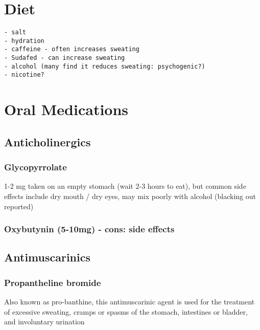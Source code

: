 \documentclass[]{book}
\begin{document}
\hypertarget{diet}{%
\chapter{Diet}\label{diet}}

\begin{verbatim}
- salt
- hydration
- caffeine - often increases sweating
- Sudafed - can increase sweating
- alcohol (many find it reduces sweating: psychogenic?)
- nicotine?
\end{verbatim}

\hypertarget{oral}{%
\chapter{Oral Medications}\label{oral}}

\hypertarget{anticholinergics}{%
\section{Anticholinergics}\label{anticholinergics}}

\hypertarget{glycopyrrolate}{%
\subsection{Glycopyrrolate}\label{glycopyrrolate}}

1-2 mg taken on an empty stomach (wait 2-3 hours to eat), but common side effects include dry mouth / dry eyes, may mix poorly with alcohol (blacking out reported)

\hypertarget{oxybutynin-5-10mg---cons-side-effects}{%
\subsection{Oxybutynin (5-10mg) - cons: side effects}\label{oxybutynin-5-10mg---cons-side-effects}}

\hypertarget{antimuscarinics}{%
\section{Antimuscarinics}\label{antimuscarinics}}

\hypertarget{propantheline-bromide}{%
\subsection{Propantheline bromide}\label{propantheline-bromide}}

Also known as pro-banthine, this antimuscarinic agent is used for the treatment of excessive sweating, cramps or spasms of the stomach, intestines or bladder, and involuntary urination
\end{document}
